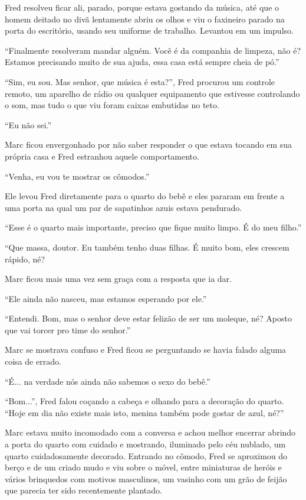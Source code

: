Fred resolveu ficar ali, parado, porque estava gostando da música, até
que o homem deitado no divã lentamente abriu os olhos e viu o faxineiro
parado na porta do escritório, usando seu uniforme de trabalho. Levantou
em um impulso.

``Finalmente resolveram mandar alguém. Você é da companhia de limpeza,
não é? Estamos precisando muito de sua ajuda, essa casa está sempre
cheia de pó.''

``Sim, eu sou. Mas senhor, que música é esta?'', Fred procurou um
controle remoto, um aparelho de rádio ou qualquer equipamento que
estivesse controlando o som, mas tudo o que viu foram caixas embutidas
no teto.

``Eu não sei.''

Marc ficou envergonhado por não saber responder o que estava tocando em
sua própria casa e Fred estranhou aquele comportamento.

``Venha, eu vou te mostrar os cômodos.''

Ele levou Fred diretamente para o quarto do bebê e eles pararam em
frente a uma porta na qual um par de sapatinhos azuis estava pendurado.

``Esse é o quarto mais importante, preciso que fique muito limpo. É do
meu filho.''

``Que massa, doutor. Eu também tenho duas filhas. É muito bom, eles
crescem rápido, né?

Marc ficou mais uma vez sem graça com a resposta que ia dar.

``Ele ainda não nasceu, mas estamos esperando por ele.''

``Entendi. Bom, mas o senhor deve estar felizão de ser um moleque, né?
Aposto que vai torcer pro time do senhor.''

Marc se mostrava confuso e Fred ficou se perguntando se havia falado
alguma coisa de errado.

``É... na verdade nós ainda não sabemos o sexo do bebê.''

``Bom...'', Fred falou coçando a cabeça e olhando para a decoração do
quarto. ``Hoje em dia não existe mais isto, menina também pode gostar de
azul, né?''

Marc estava muito incomodado com a conversa e achou melhor encerrar
abrindo a porta do quarto com cuidado e mostrando, iluminado pelo céu
nublado, um quarto cuidadosamente decorado. Entrando no cômodo, Fred se
aproximou do berço e de um criado mudo e viu sobre o móvel, entre
miniaturas de heróis e vários brinquedos com motivos masculinos, um
vasinho com um grão de feijão que parecia ter sido recentemente
plantado.

